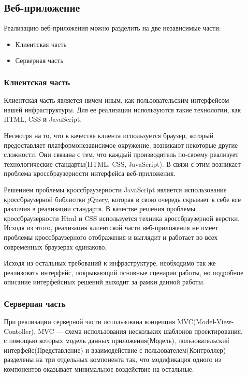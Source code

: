 \documentclass[12pt,a4paper]{extarticle}
\begin{document}
\subsection{Веб-приложение}
Реализацию веб-приложения можно разделить на две независимые части:
\begin{itemize}
	\item Клиентская часть
	\item Серверная часть
\end{itemize}

\subsubsection{Клиентская часть}
Клиентская часть является ничем иным, как пользовательским интерфейсом нашей инфраструктуры. Для ее реализации используются такие технологии, как HTML, CSS и JavaScript.

Несмотря на то, что в качестве клиента используется браузер, который предоставляет платформонезависимое окружение, возникают некоторые другие сложности. Они связана с тем, что каждый производитель по-своему реализует технологические стандарты(HTML, CSS, JavaScript). В связи с этим возникает проблема кроссбраузерности интерфейса веб-приложения.

Решением проблемы кроссбраузерности JavaScript является использование кроссбраузерной библиотки jQuery, которая в свою очередь скрывает в себе все различия в реализации стандарта. В качестве решения проблемы кроссбраузерности Html и CSS используется техника кроссбраузерной верстки. Исходя из этого, реализация клиентской части веб-приложения не имеет проблемы кроссбраузерного отображения и выглядит и работает во всех современных браузерах одинаково.

Исходя из остальных требований к инфраструктуре, необходимо так же реализовать интерфейс, покрывающий основные сценарии работы, но подробное описание интерфейсных решений выходит за рамки данной работы.

\subsubsection{Серверная часть}
При реализации серверной части использована концепция MVC(Model-View-Contoller).
MVC — схема использования нескольких шаблонов проектирования, с помощью которых модель данных приложения(Модель), пользовательский интерфейс(Представление) и взаимодействие с пользователем(Контроллер) разделены на три отдельных компонента так, что модификация одного из компонентов оказывает минимальное воздействие на остальные. 
\end{document}

